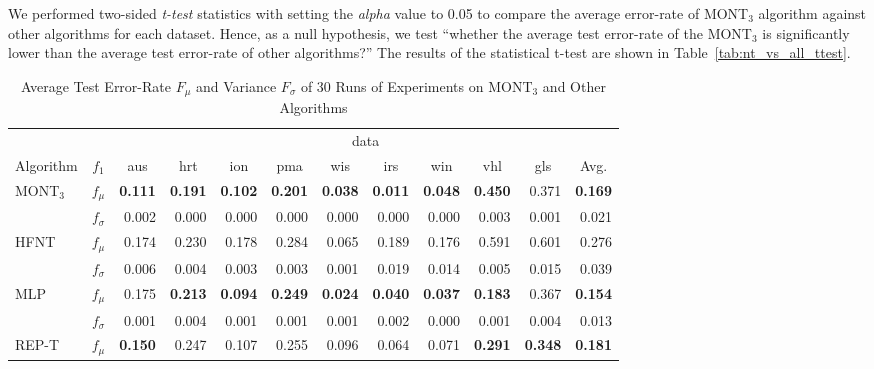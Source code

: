 \documentclass[conference]{IEEEtran}
\begin{document}
We performed two-sided \textit{t-test} statistics with setting the \textit{alpha} value to 0.05 to compare the average error-rate of MONT$_3$ algorithm against other algorithms for each dataset. Hence, as a null hypothesis, we test ``whether the average test error-rate of the MONT$_3$ is significantly lower than the average test error-rate of other algorithms?'' The results of the statistical t-test are shown in Table~\ref{tab:nt_vs_all_ttest}.  
\begin{table*}
    \begin{center}
        \renewcommand{\arraystretch}{1}
        \setlength{\tabcolsep}{10pt}
        {\caption{Average Test Error-Rate $ F_{\mu} $ and Variance $ F_{\sigma} $ of 30 Runs of Experiments on MONT$_3$ and Other Algorithms}
            \label{tab:nt_vs_all}}
        \begin{tabular}{lrrrrrrrrrrr}
            \hline
            & & \multicolumn{10}{c}{data} \\
            \cline{3-11}
            Algorithm &  \multicolumn{1}{c}{$ f_1 $} & 
            \multicolumn{1}{c}{aus}   & \multicolumn{1}{c}{hrt}  &  \multicolumn{1}{c}{ion}   & \multicolumn{1}{c}{pma}  &  \multicolumn{1}{c}{wis}   & \multicolumn{1}{c}{irs}  & \multicolumn{1}{c}{win}   & \multicolumn{1}{c}{vhl}  & \multicolumn{1}{c}{gls}   & \multicolumn{1}{c}{Avg.} \\
            \hline
            MONT$_3$ & $ f_{\mu} $ & \textbf{0.111} & \textbf{0.191} & \textbf{0.102} & \textbf{0.201} & \textbf{0.038} & \textbf{0.011} & \textbf{0.048} & \textbf{0.450} & 0.371 & \textbf{0.169} \\
            & $ f_{\sigma} $ & 0.002 & 0.000 & 0.000 & 0.000 & 0.000 & 0.000 & 0.000 & 0.003 & 0.001 & 0.021 \\
HFNT & $ f_{\mu} $ & 0.174 & 0.230 & 0.178 & 0.284 & 0.065 & 0.189 & 0.176 & 0.591 & 0.601 & 0.276 \\
            & $ f_{\sigma} $ & 0.006 & 0.004 & 0.003 & 0.003 & 0.001 & 0.019 & 0.014 & 0.005 & 0.015 & 0.039 \\
            MLP & $ f_{\mu} $ & 0.175 & \textbf{0.213} & \textbf{0.094} & \textbf{0.249} & \textbf{0.024} & \textbf{0.040} & \textbf{0.037} & \textbf{0.183} & 0.367 & \textbf{0.154} \\
            & $ f_{\sigma} $ & 0.001 & 0.004 & 0.001 & 0.001 & 0.001 & 0.002 & 0.000 & 0.001 & 0.004 & 0.013 \\
            REP-T & $ f_{\mu} $ & \textbf{0.150} & 0.247 & 0.107 & 0.255 & 0.096 & 0.064 & 0.071 & \textbf{0.291} & \textbf{0.348} & \textbf{0.181} \\

\end{tabular}
\end{center}
\end{table*}
\end{document}
